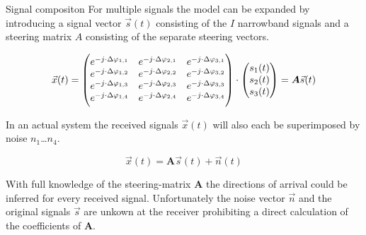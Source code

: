 \begin{subchapter}{Signal compositon}
  For multiple signals the model can be expanded by
  introducing a signal vector $\vec{s}(t)$ consisting
  of the $I$ narrowband signals and a steering matrix
  $A$ consisting of the separate steering vectors.

  \begin{equation}
    \vec{x}(t) =
    \begin{pmatrix}
      e^{-j \cdot \Delta\varphi_{1,1}} & e^{-j \cdot \Delta\varphi_{2,1}} & e^{-j \cdot \Delta\varphi_{3,1}} \\
      e^{-j \cdot \Delta\varphi_{1,2}} & e^{-j \cdot \Delta\varphi_{2,2}} & e^{-j \cdot \Delta\varphi_{3,2}} \\
      e^{-j \cdot \Delta\varphi_{1,3}} & e^{-j \cdot \Delta\varphi_{2,3}} & e^{-j \cdot \Delta\varphi_{3,3}} \\
      e^{-j \cdot \Delta\varphi_{1,4}} & e^{-j \cdot \Delta\varphi_{2,4}} & e^{-j \cdot \Delta\varphi_{3,4}}
    \end{pmatrix}
    \cdot
    \begin{pmatrix}
      s_{1}(t) \\
      s_{2}(t) \\
      s_{3}(t)
    \end{pmatrix}
    = \\
    \bm{A} \vec{s}(t)
  \end{equation}

  In an actual system the received signals $\vec{x}(t)$ will also
  each be superimposed by noise $n_{1}$…$n_{4}$.

  \begin{equation}
    \vec{x}(t) =  \bm{A} \vec{s}(t) + \vec{n}(t)
  \end{equation}

  With full knowledge of the steering-matrix $\bm{A}$ the
  directions of arrival could be inferred for every received
  signal. Unfortunately the noise vector $\vec{n}$ and the
  original signals $\vec{s}$ are unkown at the receiver prohibiting
  a direct calculation of the coefficients of $\bm{A}$.
\end{subchapter}

